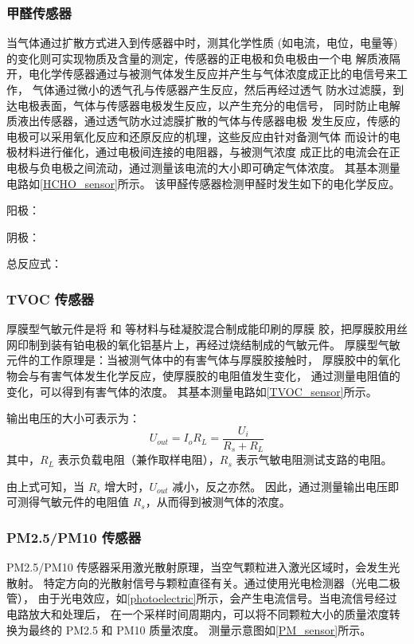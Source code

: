 \documentclass[12pt,hyperref,a4paper,UTF8]{ctexart}
\begin{document}
\subsubsection{甲醛传感器}
当气体通过扩散方式进入到传感器中时，测其化学性质 (如电流，电位，电量等)
的变化则可实现物质及含量的测定，传感器的正电极和负电极由一个电
解质液隔开，电化学传感器通过与被测气体发生反应并产生与气体浓度成正比的电信号来工作，
气体通过微小的透气孔与传感器产生反应，然后再经过透气
防水过滤膜，到达电极表面，气体与传感器电极发生反应，以产生充分的电信号，
同时防止电解质液出传感器，通过透气防水过滤膜扩散的气体与传感器电极
发生反应，传感的电极可以采用氧化反应和还原反应的机理，这些反应由针对备测气体
而设计的电极材料进行催化，通过电极间连接的电阻器，与被测气浓度
成正比的电流会在正电极与负电极之间流动，通过测量该电流的大小即可确定气体浓度。
其基本测量电路如\autoref{HCHO_sensor}所示。
该甲醛传感器检测甲醛时发生如下的电化学反应。

阳极：

阴极：

总反应式：

\subsubsection{TVOC 传感器}
厚膜型气敏元件是将  和  等材料与硅凝胶混合制成能印刷的厚膜
胶，把厚膜胶用丝网印制到装有铂电极的氧化铝基片上，再经过烧结制成的气敏元件。
厚膜型气敏元件的工作原理是：当被测气体中的有害气体与厚膜胶接触时，
厚膜胶中的氧化物会与有害气体发生化学反应，使厚膜胶的电阻值发生变化，
通过测量电阻值的变化，可以得到有害气体的浓度。
其基本测量电路如\autoref{TVOC_sensor}所示。

输出电压的大小可表示为：
\begin{equation}
    U_{out} = I_oR_L = \frac{U_i}{R_s + R_L}
\end{equation}
其中，$R_L$ 表示负载电阻（兼作取样电阻），$R_s$ 表示气敏电阻测试支路的电阻。

由上式可知，当 $R_s$ 增大时，$U_{out}$ 减小，反之亦然。
因此，通过测量输出电压即可测得气敏元件的电阻值 $R_s$，从而得到被测气体的浓度。

\subsubsection{PM2.5/PM10 传感器}
PM2.5/PM10 传感器采用激光散射原理，当空气颗粒进入激光区域时，会发生光散射。
特定方向的光散射信号与颗粒直径有关。通过使用光电检测器（光电二极管），
由于光电效应，如\autoref{photoelectric}所示，会产生电流信号。当电流信号经过电路放大和处理后，
在一个采样时间周期内，可以将不同颗粒大小的质量浓度转换为最终的 PM2.5 和 PM10 质量浓度。
测量示意图如\autoref{PM_sensor}所示。
\end{document}
